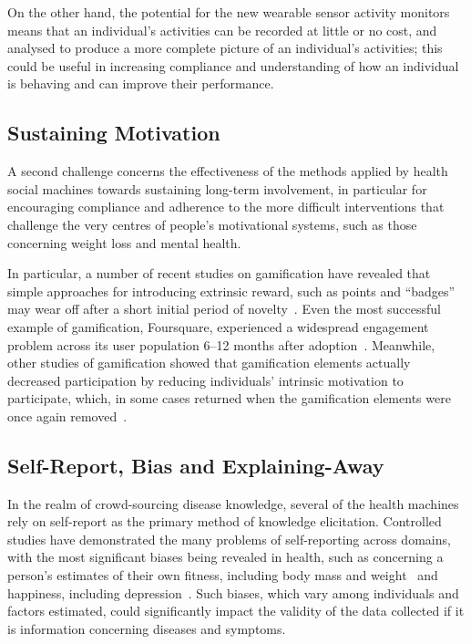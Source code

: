 \documentclass{sig-alternate}
\begin{document}
On the other hand, the potential for the new wearable sensor activity
monitors means that an individual's activities can be recorded at
little or no cost, and analysed to produce a more complete picture of
an individual's activities; this could be useful in increasing
compliance and understanding of how an individual is behaving and can
improve their performance.

\subsection{Sustaining Motivation}
\label{sec:motivation}
A second challenge concerns the effectiveness of the methods applied by
health social machines towards sustaining long-term involvement, in
particular for encouraging compliance and adherence to the more
difficult interventions that challenge the very centres of people's
motivational systems, such as those concerning weight loss and
mental health.

In particular, a number of recent studies on gamification have
revealed that simple approaches for introducing extrinsic reward, such
as points and ``badges'' may wear off after a short initial period of
novelty~\cite{therebedragons}.  Even the most successful example of
gamification, Foursquare, experienced a widespread engagement problem
across its user population 6--12 months after adoption~\cite{browningattheedges}. Meanwhile, other studies of gamification
showed that gamification elements actually decreased participation by
reducing individuals' intrinsic motivation to participate, which, in
some cases returned when the gamification elements were once again
removed~\cite{Thom:2012:RGE:2145204.2145362}.

\subsection{Self-Report, Bias and Explaining-Away}

In the realm of crowd-sourcing disease knowledge, several of the
health machines rely on self-report as the primary method of knowledge
elicitation.  Controlled studies have demonstrated the many problems
of self-reporting across domains, with the most significant biases being
revealed in health, such as concerning a person's estimates of their
own fitness, including body mass and weight~\cite{elgar2005validity}
and happiness, including depression~\cite{hunt2003self}. Such biases,
which vary among individuals and factors estimated, could
significantly impact the validity of the data collected if it is
information concerning diseases and symptoms.
\end{document}
